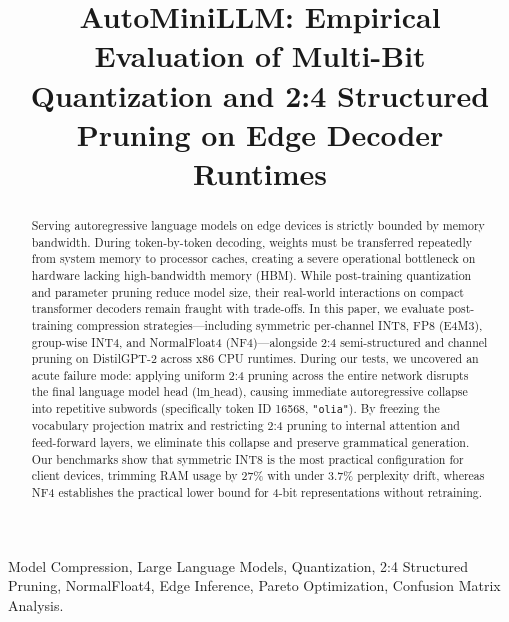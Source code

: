 \documentclass[conference]{IEEEtran}
\begin{document}
\title{AutoMiniLLM: Empirical Evaluation of Multi-Bit Quantization and 2:4 Structured Pruning on Edge Decoder Runtimes}

\author{
}

\maketitle

\begin{abstract}
Serving autoregressive language models on edge devices is strictly bounded by memory bandwidth. During token-by-token decoding, weights must be transferred repeatedly from system memory to processor caches, creating a severe operational bottleneck on hardware lacking high-bandwidth memory (HBM). While post-training quantization and parameter pruning reduce model size, their real-world interactions on compact transformer decoders remain fraught with trade-offs. In this paper, we evaluate post-training compression strategies---including symmetric per-channel INT8, FP8 (E4M3), group-wise INT4, and NormalFloat4 (NF4)---alongside 2:4 semi-structured and channel pruning on DistilGPT-2 across x86 CPU runtimes. During our tests, we uncovered an acute failure mode: applying uniform 2:4 pruning across the entire network disrupts the final language model head ($\text{lm\_head}$), causing immediate autoregressive collapse into repetitive subwords (specifically token ID 16568, \texttt{"olia"}). By freezing the vocabulary projection matrix and restricting 2:4 pruning to internal attention and feed-forward layers, we eliminate this collapse and preserve grammatical generation. Our benchmarks show that symmetric INT8 is the most practical configuration for client devices, trimming RAM usage by 27\% with under 3.7\% perplexity drift, whereas NF4 establishes the practical lower bound for 4-bit representations without retraining.
\end{abstract}

\begin{IEEEkeywords}
Model Compression, Large Language Models, Quantization, 2:4 Structured Pruning, NormalFloat4, Edge Inference, Pareto Optimization, Confusion Matrix Analysis.
\end{IEEEkeywords}
\end{document}

